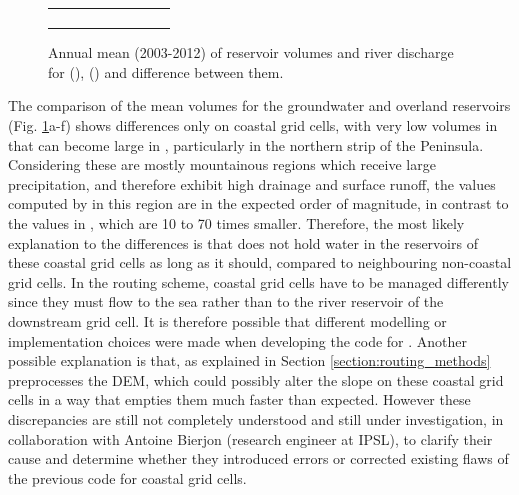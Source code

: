 \begin{figure}[htbp]
{\begin{minipage}{1.25\linewidth}
\begin{tabular}{ccc}
\begin{subfigure}[b]{0.33\linewidth}
                \end{subfigure} \\
            \end{tabular}
        \end{minipage}
    }
    \caption{Annual mean (2003-2012) of reservoir volumes and river discharge for \std (\noirr), \native (\noirr) and difference between them.}
    \label{fig:routing_reservoirs_halfdeg}
\end{figure}


The comparison of the mean volumes for the groundwater and overland reservoirs (Fig. \ref{fig:routing_reservoirs_halfdeg}a-f) shows differences only on coastal grid cells, with very low volumes in \std that can become large in \native, particularly in the northern strip of the Peninsula. Considering these are mostly mountainous regions which receive large precipitation, and therefore exhibit high drainage and surface runoff, the values computed by \native in this region are in the expected order of magnitude, in contrast to the values in \std, which are 10 to 70 times smaller.
Therefore, the most likely explanation to the differences is that \std does not hold water in the reservoirs of these coastal grid cells as long as it should, compared to neighbouring non-coastal grid cells. In the routing scheme, coastal grid cells have to be managed differently since they must flow to the sea rather than to the river reservoir of the downstream grid cell. It is therefore possible that different modelling or implementation choices were made when developing the code for \std. 
Another possible explanation is that, as explained in Section \ref{section:routing_methods} \std preprocesses the DEM, which could possibly alter the slope on these coastal grid cells in a way that empties them much faster than expected.
However these discrepancies are still not completely understood and still under investigation, in collaboration with Antoine Bierjon (research engineer at IPSL), to clarify their cause and determine whether they introduced errors or corrected existing flaws of the previous code for coastal grid cells.

